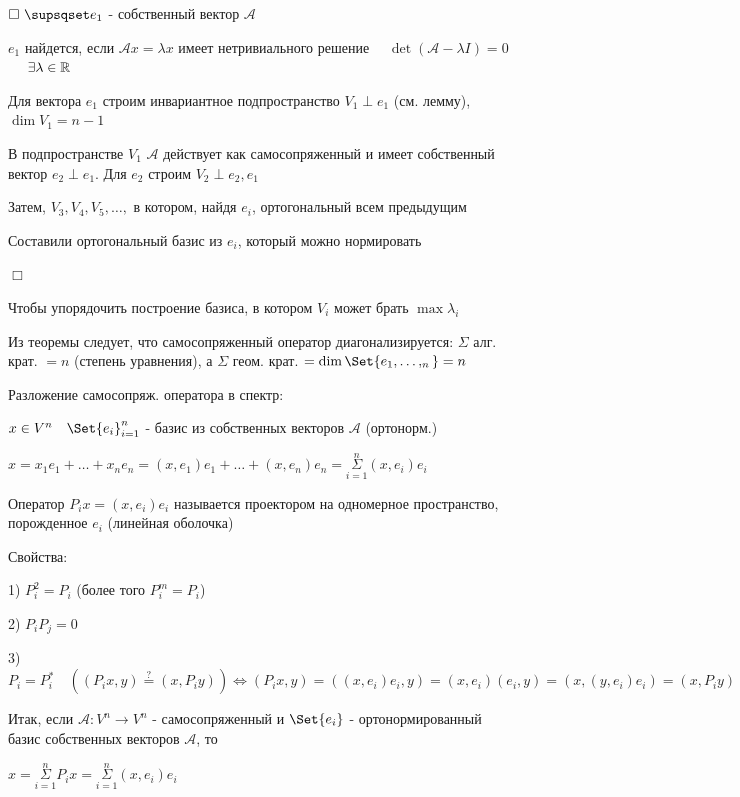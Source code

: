 \documentclass[12pt]{article}
\begin{document}
    $\Box \ \supsqset e_1$ - собственный вектор $\mathcal{A}$

    $e_1$ найдется, если $\mathcal{A}x = \lambda x$ имеет нетривиального решение \ \Longleftrightarrow \
    $\det(\mathcal{A} - \lambda I) = 0$ \  \ $\exists \lambda \in \mathbb{R}$

    Для вектора $e_1$ строим инвариантное подпространство $V_1 \perp e_1$ (см. лемму), $\dim V_1 = n - 1$

    В подпространстве $V_1$ $\mathcal{A}$ действует как самосопряженный и имеет собственный вектор $e_2 \perp e_1$.
    Для $e_2$ строим $V_2 \perp e_2, e_1$

    Затем, $V_3, V_4, V_5, \dots,$ в котором, найдя $e_i$, ортогональный всем предыдущим

    Составили ортогональный базис из $e_i$, который можно нормировать

    $\Box$

    \Nota Чтобы упорядочить построение базиса, в котором $V_i$ может брать $\max \lambda_i$

    \Nota Из теоремы следует, что самосопряженный оператор диагонализируется: $\Sigma$ алг. крат. $ = n$ (степень уравнения), а $\Sigma$ геом. крат. $= \dim \Set{e_1, \dots, _n} = n$


    Разложение самосопряж. оператора в спектр:

    $x \in V^n \quad \Set{e_i}_{i=1}^n$ - базис из собственных векторов $\mathcal{A}$ (ортонорм.)

    $x = x_1 e_1 + \dots + x_n e_n = (x, e_1) e_1 + \dots + (x, e_n) e_n = \overset{n}{\underset{i = 1}{\Sigma}} (x, e_i) e_i$

    \Def Оператор $P_i x = (x, e_i) e_i$ называется проектором на одномерное пространство, порожденное $e_i$ (линейная оболочка)

    Свойства:

    1) $P_i^2 = P_i$ (более того $P^m_i = P_i$)

    2) $P_i P_j = 0$

    3) $P_i = P_i^* \quad ((P_i x, y) \stackrel{?}{=} (x, P_i y)) \Longleftrightarrow (P_i x, y) = ((x, e_i) e_i, y) = (x, e_i) (e_i, y) = (x, (y, e_i) e_i) = (x, P_i y)$

    Итак, если $\mathcal{A}: V^n \to V^n$ - самосопряженный и $\Set{e_i}$ - ортонормированный базис собственных векторов $\mathcal{A}$, то

    $x = \overset{n}{\underset{i = 1}{\Sigma}} P_i x = \overset{n}{\underset{i = 1}{\Sigma}} (x, e_i) e_i$
\end{document}

